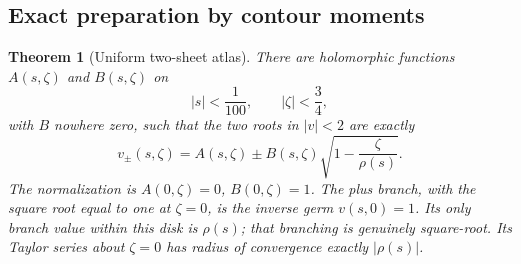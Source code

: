 \documentclass[11pt,a4paper]{article}
\newtheorem{theorem}{Theorem}[section]
\theoremstyle{definition}
\theoremstyle{remark}
\begin{document}
\subsection{Exact preparation by contour moments}
\begin{theorem}[Uniform two-sheet atlas]\label{thm:atlas}
There are holomorphic functions $A(s,\zeta)$ and $B(s,\zeta)$ on
\[
 |s|<\frac1{100},\qquad |\zeta|<\frac34,
\]
with $B$ nowhere zero, such that the two roots in $|v|<2$ are exactly
\begin{equation}\label{eq:atlas}
 v_\pm(s,\zeta)=A(s,\zeta)
       \pm B(s,\zeta)\sqrt{1-\frac{\zeta}{\rho(s)}}.
\end{equation}
The normalization is $A(0,\zeta)=0$, $B(0,\zeta)=1$. The plus branch,
with the square root equal to one at $\zeta=0$, is the inverse germ
$v(s,0)=1$. Its only branch value within this disk is $\rho(s)$; that
branching is genuinely square-root. Its Taylor series about $\zeta=0$
has radius of convergence exactly $|\rho(s)|$.
\end{theorem}
\end{document}
